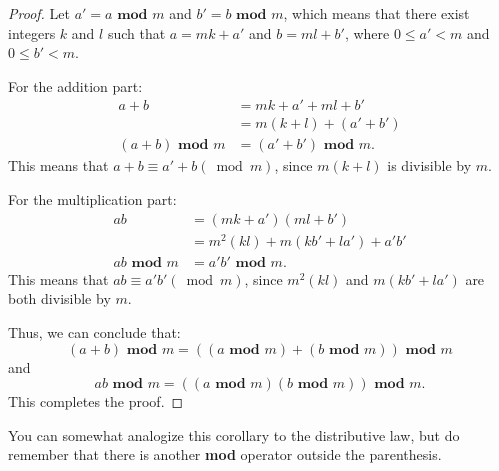         \begin{proof}
        Let \( a' = a \textbf{ mod } m \) and \( b' = b \textbf{ mod } m \), which means that there exist integers \( k \) and \( l \) such that \( a = mk + a' \) and \( b = ml + b' \), where \( 0 \leq a' < m \) and \( 0 \leq b' < m \).
        
        For the addition part:
        \begin{align*}
        a + b &= mk + a' + ml + b' \\
        &= m(k + l) + (a' + b') \\
        (a + b) \textbf{ mod } m &= (a' + b') \textbf{ mod } m.
        \end{align*}
        This means that $a+b\equiv a'+b(\bmod m)$, since \( m(k + l) \) is divisible by \( m \).
        
        For the multiplication part:
        \begin{align*}
        ab &= (mk + a')(ml + b') \\
        &= m^2(kl) + m(kb' + la') + a'b' \\
        ab \textbf{ mod } m &= a'b' \textbf{ mod } m.
        \end{align*}
        This means that $ab\equiv a'b'(\bmod m)$, since \( m^2(kl) \) and \( m(kb' + la') \) are both divisible by \( m \).
        
        Thus, we can conclude that:
        \[(a + b) \textbf{ mod } m = ((a \textbf{ mod } m) + (b \textbf{ mod } m)) \textbf{ mod } m\]
        and
        \[ab \textbf{ mod } m = ((a \textbf{ mod } m)(b \textbf{ mod } m)) \textbf{ mod } m.\]
        This completes the proof.
        \end{proof}
    \begin{remark}
        You can somewhat analogize this corollary to the distributive law, but do remember that
        there is another \textbf{mod} operator outside the parenthesis.
    \end{remark}

